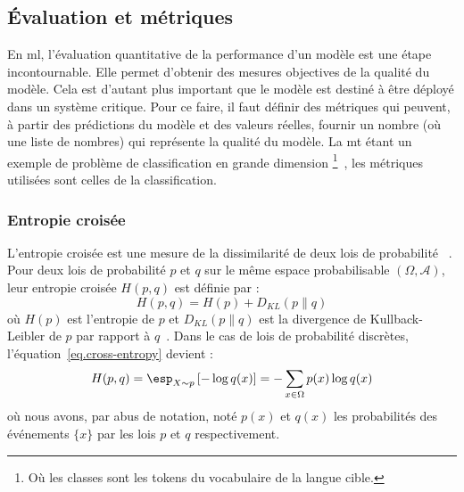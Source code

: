 \subsection{Évaluation et métriques}

En \gls{ml}, l'évaluation quantitative de la performance d'un modèle est une étape incontournable.
Elle permet d'obtenir des mesures objectives de la qualité du modèle.
Cela est d'autant plus important que le modèle est destiné à être déployé dans un système critique.
Pour ce faire, il faut définir des métriques qui peuvent, 
à partir des prédictions du modèle et des valeurs réelles,
fournir un nombre (où une liste de nombres) qui représente la qualité du modèle.
La \gls{mt} étant un exemple de problème de classification en grande dimension%
\footnote{
Où les classes sont les tokens du vocabulaire de la langue cible.
}~\cite{deep-nmt-survey},
les métriques utilisées sont celles de la classification.

\subsubsection{Entropie croisée}

L'entropie croisée est une mesure de la dissimilarité de deux lois de probabilité%
~\cite{Vasilev_Slater_Spacagna_Roelants_Zocca_2019}.
Pour deux lois de probabilité \(p\) et \(q\) sur le même espace probabilisable \((\Omega, \mathcal{A})\),
leur entropie croisée \(H(p, q)\) est définie par :
\begin{equation}
    \label{eq.cross-entropy}
    H(p, q) = H(p) + D_{KL}(p \parallel q)
\end{equation}
où \(H(p)\) est l'entropie de \(p\) 
et \(D_{KL}(p \parallel q)\) est la divergence de Kullback-Leibler de \(p\) par rapport à \(q\)~\cite{Bishop_2006}.
Dans le cas de lois de probabilité discrètes, l'équation~\ref{eq.cross-entropy} devient :
\begin{equation}
    \label{eq.cross-entropy-discrete}
    H(p, q) = \esp_{X \sim p} \left[ - \log q(x) \right]
    = - \sum_{x \in \Omega} p(x) \log q(x)
\end{equation}
où nous avons, par abus de notation, noté \(p(x)\) et \(q(x)\) 
les probabilités des événements \(\{x\}\) par les lois \(p\) et \(q\) respectivement.

